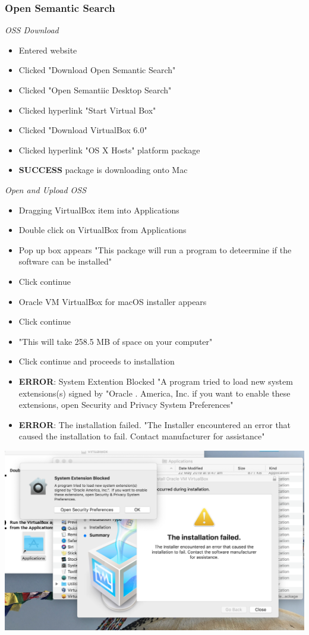 \documentclass{article}
\begin{document}
\subsubsection{Open Semantic Search}
\textit{OSS Download}
\begin{itemize}
\item Entered website
\item Clicked "Download Open Semantic Search"
\item Clicked "Open Semantiic Desktop Search"
\item Clicked hyperlink "Start Virtual Box"
\item Clicked "Download VirtualBox 6.0"
\item Clicked hyperlink "OS X Hosts" platform package 
\item \textbf{SUCCESS} package is downloading onto Mac 
\end{itemize}
\textit{Open and Upload OSS }
\begin{itemize}
\item Dragging VirtualBox item into Applications
\item Double click on VirtualBox from Applications 
\item Pop up box appears "This package will run a program to deteermine if the software can be installed"
\item Click continue
\item Oracle VM VirtualBox for macOS installer appears
\item Click continue
\item "This will take 258.5 MB of space on your computer" 
\item Click continue and proceeds to installation
\item \textbf{ERROR}: System Extention Blocked "A program tried to load new system extensions(s) signed by "Oracle . America,  Inc. if you want to enable these extensions, open Security and Privacy System Preferences" 
\item \textbf{ERROR}: The installation failed. "The Installer encountered an error that caused the installation to fail. Contact manufacturer for assistance"
\end{itemize}

\includegraphics[width=\textwidth]{Images/OSSfail.png}
\end{document}
